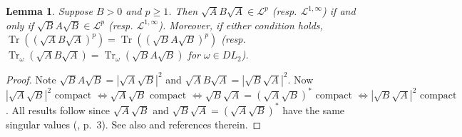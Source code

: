 \documentclass[final,1p]{elsarticle}
\numberwithin{equation}{section}
\theoremstyle{plain}
\newtheorem{lemma}[thm]{Lemma}
\theoremstyle{definition}
\begin{document}
\begin{lemma} \label{lemma:sym}
Suppose $B > 0$ and $p \geq 1$.  Then $\sqrt{A}B\sqrt{A} \in \mathcal{L}^p$ (resp. $\mathcal{L}^{1,\infty}$) if and only if $\sqrt{B}A\sqrt{B} \in \mathcal{L}^p$ (resp. $\mathcal{L}^{1,\infty}$).  Moreover, if either condition holds, $\operatorname{Tr}((\sqrt{A}B\sqrt{A})^p) = \operatorname{Tr}((\sqrt{B}A\sqrt{B})^p)$
(resp. $\operatorname{Tr}_\omega(\sqrt{A}B\sqrt{A}) = \operatorname{Tr}_\omega(\sqrt{B}A\sqrt{B})$ for $\omega \in DL_2$).
\end{lemma}
\begin{proof}
Note $\sqrt{B}A\sqrt{B} = |\sqrt{A}\sqrt{B}|^2$
and $\sqrt{A}B\sqrt{A} = |\sqrt{B} \sqrt{A}|^2$. Now
$|\sqrt{A} \sqrt{B}|^2 \text{ compact } \Leftrightarrow  \sqrt{A}\sqrt{B} \text{ compact } \Leftrightarrow  \sqrt{B}\sqrt{A} = (\sqrt{A}\sqrt{B})^* \text{ compact } \Leftrightarrow  |\sqrt{B}\sqrt{A}|^2 \text{ compact}$.
All results follow since $\sqrt{A}\sqrt{B}$ and $\sqrt{B}\sqrt{A} = (\sqrt{A}\sqrt{B})^*$ have the same singular values (\cite{S}, p.~3).
See also \cite{Bik98} and references therein.
\end{proof}
\end{document}
